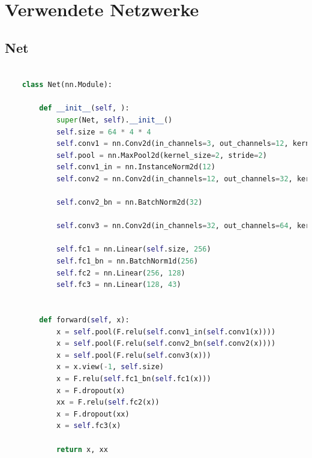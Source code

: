\documentclass[twoside, 11pt,a4paper]{article}
\numberwithin{equation}{section}
\begin{document}
	\printglossaries
	\newpage
	\appendix
	\section{Verwendete Netzwerke}
	\subsection{Net}
	
	\begin{lstlisting}[language=Python, caption=Kleines Netzwerk]
	
	class Net(nn.Module):
	
		def __init__(self, ):
			super(Net, self).__init__()
			self.size = 64 * 4 * 4
			self.conv1 = nn.Conv2d(in_channels=3, out_channels=12, kernel_size=5, padding=2)
			self.pool = nn.MaxPool2d(kernel_size=2, stride=2)
			self.conv1_in = nn.InstanceNorm2d(12)
			self.conv2 = nn.Conv2d(in_channels=12, out_channels=32, kernel_size=5, padding=2)
			
			self.conv2_bn = nn.BatchNorm2d(32)
			
			self.conv3 = nn.Conv2d(in_channels=32, out_channels=64, kernel_size=5, padding=2)
			
			self.fc1 = nn.Linear(self.size, 256)
			self.fc1_bn = nn.BatchNorm1d(256)
			self.fc2 = nn.Linear(256, 128)
			self.fc3 = nn.Linear(128, 43)
		
	
		def forward(self, x):
			x = self.pool(F.relu(self.conv1_in(self.conv1(x))))
			x = self.pool(F.relu(self.conv2_bn(self.conv2(x))))
			x = self.pool(F.relu(self.conv3(x)))
			x = x.view(-1, self.size)
			x = F.relu(self.fc1_bn(self.fc1(x)))
			x = F.dropout(x)
			xx = F.relu(self.fc2(x))
			x = F.dropout(xx)
			x = self.fc3(x)
			
			return x, xx
	
	\end{lstlisting}
	
\end{document}
